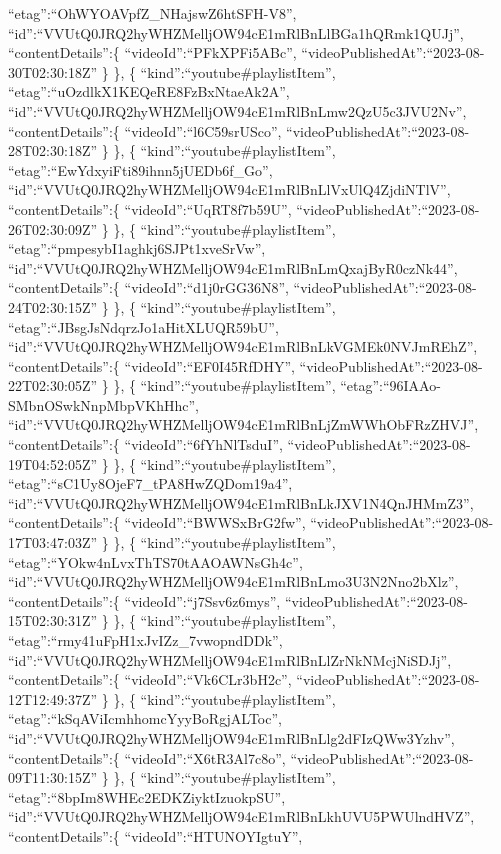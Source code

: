 \documentclass[11pt]{article}
\begin{document}
``etag'':``OhWYOAVpfZ\_NHajswZ6htSFH-V8'',
``id'':``VVUtQ0JRQ2hyWHZMelljOW94cE1mRlBnLlBGa1hQRmk1QUJj'',
``contentDetails'':\{ ``videoId'':``PFkXPFi5ABc'',
``videoPublishedAt'':``2023-08-30T02:30:18Z'' \} \}, \{
``kind'':``youtube\#playlistItem'',
``etag'':``uOzdlkX1KEQeRE8FzBxNtaeAk2A'',
``id'':``VVUtQ0JRQ2hyWHZMelljOW94cE1mRlBnLmw2QzU5c3JVU2Nv'',
``contentDetails'':\{ ``videoId'':``l6C59srUSco'',
``videoPublishedAt'':``2023-08-28T02:30:18Z'' \} \}, \{
``kind'':``youtube\#playlistItem'',
``etag'':``EwYdxyiFti89ihnn5jUEDb6f\_Go'',
``id'':``VVUtQ0JRQ2hyWHZMelljOW94cE1mRlBnLlVxUlQ4ZjdiNTlV'',
``contentDetails'':\{ ``videoId'':``UqRT8f7b59U'',
``videoPublishedAt'':``2023-08-26T02:30:09Z'' \} \}, \{
``kind'':``youtube\#playlistItem'',
``etag'':``pmpesybI1aghkj6SJPt1xveSrVw'',
``id'':``VVUtQ0JRQ2hyWHZMelljOW94cE1mRlBnLmQxajByR0czNk44'',
``contentDetails'':\{ ``videoId'':``d1j0rGG36N8'',
``videoPublishedAt'':``2023-08-24T02:30:15Z'' \} \}, \{
``kind'':``youtube\#playlistItem'',
``etag'':``JBsgJsNdqrzJo1aHitXLUQR59bU'',
``id'':``VVUtQ0JRQ2hyWHZMelljOW94cE1mRlBnLkVGMEk0NVJmREhZ'',
``contentDetails'':\{ ``videoId'':``EF0I45RfDHY'',
``videoPublishedAt'':``2023-08-22T02:30:05Z'' \} \}, \{
``kind'':``youtube\#playlistItem'',
``etag'':``96IAAo-SMbnOSwkNnpMbpVKhHhc'',
``id'':``VVUtQ0JRQ2hyWHZMelljOW94cE1mRlBnLjZmWWhObFRzZHVJ'',
``contentDetails'':\{ ``videoId'':``6fYhNlTsduI'',
``videoPublishedAt'':``2023-08-19T04:52:05Z'' \} \}, \{
``kind'':``youtube\#playlistItem'',
``etag'':``sC1Uy8OjeF7\_tPA8HwZQDom19a4'',
``id'':``VVUtQ0JRQ2hyWHZMelljOW94cE1mRlBnLkJXV1N4QnJHMmZ3'',
``contentDetails'':\{ ``videoId'':``BWWSxBrG2fw'',
``videoPublishedAt'':``2023-08-17T03:47:03Z'' \} \}, \{
``kind'':``youtube\#playlistItem'',
``etag'':``YOkw4nLvxThTS70tAAOAWNsGh4c'',
``id'':``VVUtQ0JRQ2hyWHZMelljOW94cE1mRlBnLmo3U3N2Nno2bXlz'',
``contentDetails'':\{ ``videoId'':``j7Ssv6z6mys'',
``videoPublishedAt'':``2023-08-15T02:30:31Z'' \} \}, \{
``kind'':``youtube\#playlistItem'',
``etag'':``rmy41uFpH1xJvIZz\_7vwopndDDk'',
``id'':``VVUtQ0JRQ2hyWHZMelljOW94cE1mRlBnLlZrNkNMcjNiSDJj'',
``contentDetails'':\{ ``videoId'':``Vk6CLr3bH2c'',
``videoPublishedAt'':``2023-08-12T12:49:37Z'' \} \}, \{
``kind'':``youtube\#playlistItem'',
``etag'':``kSqAViIcmhhomcYyyBoRgjALToc'',
``id'':``VVUtQ0JRQ2hyWHZMelljOW94cE1mRlBnLlg2dFIzQWw3Yzhv'',
``contentDetails'':\{ ``videoId'':``X6tR3Al7c8o'',
``videoPublishedAt'':``2023-08-09T11:30:15Z'' \} \}, \{
``kind'':``youtube\#playlistItem'',
``etag'':``8bpIm8WHEc2EDKZiyktIzuokpSU'',
``id'':``VVUtQ0JRQ2hyWHZMelljOW94cE1mRlBnLkhUVU5PWUlndHVZ'',
``contentDetails'':\{ ``videoId'':``HTUNOYIgtuY'',
\end{document}
